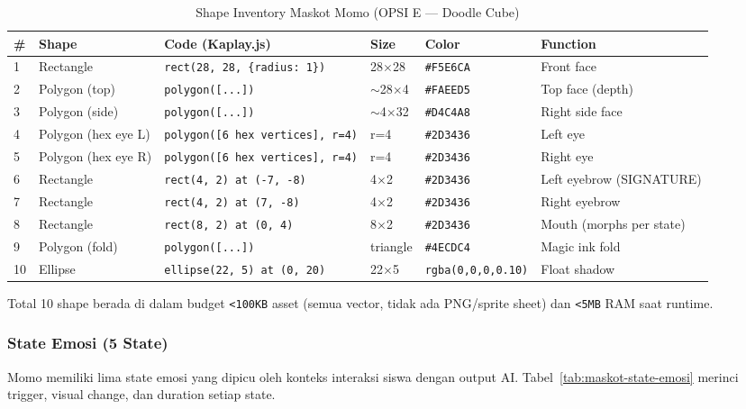 \documentclass[12pt,a4paper,oneside,openany]{report}
\begin{document}
\begin{table}[H]
\centering
\caption{Shape Inventory Maskot Momo (OPSI E --- Doodle Cube)}
\label{tab:maskot-shape-inventory}
\begin{tabular}{|p{0.5cm}|p{2.5cm}|p{5cm}|p{1.5cm}|p{1.8cm}|p{2.5cm}|}
\hline
\textbf{\#} & \textbf{Shape} & \textbf{Code (Kaplay.js)} & \textbf{Size} & \textbf{Color} & \textbf{Function} \\ \hline
1 & Rectangle & \texttt{rect(28, 28, \{radius: 1\})} & 28$\times$28 & \texttt{\#F5E6CA} & Front face \\ \hline
2 & Polygon (top) & \texttt{polygon([...])} & $\sim$28$\times$4 & \texttt{\#FAEED5} & Top face (depth) \\ \hline
3 & Polygon (side) & \texttt{polygon([...])} & $\sim$4$\times$32 & \texttt{\#D4C4A8} & Right side face \\ \hline
4 & Polygon (hex eye L) & \texttt{polygon([6 hex vertices], r=4)} & r=4 & \texttt{\#2D3436} & Left eye \\ \hline
5 & Polygon (hex eye R) & \texttt{polygon([6 hex vertices], r=4)} & r=4 & \texttt{\#2D3436} & Right eye \\ \hline
6 & Rectangle & \texttt{rect(4, 2) at (-7, -8)} & 4$\times$2 & \texttt{\#2D3436} & Left eyebrow (SIGNATURE) \\ \hline
7 & Rectangle & \texttt{rect(4, 2) at (7, -8)} & 4$\times$2 & \texttt{\#2D3436} & Right eyebrow \\ \hline
8 & Rectangle & \texttt{rect(8, 2) at (0, 4)} & 8$\times$2 & \texttt{\#2D3436} & Mouth (morphs per state) \\ \hline
9 & Polygon (fold) & \texttt{polygon([...])} & triangle & \texttt{\#4ECDC4} & Magic ink fold \\ \hline
10 & Ellipse & \texttt{ellipse(22, 5) at (0, 20)} & 22$\times$5 & \texttt{rgba(0,0,0,0.10)} & Float shadow \\ \hline
\end{tabular}
\end{table}

Total 10 shape berada di dalam budget \texttt{<100KB} asset (semua vector, tidak ada PNG/sprite sheet) dan \texttt{<5MB} RAM saat runtime.

\subsubsection{State Emosi (5 State)}

Momo memiliki lima state emosi yang dipicu oleh konteks interaksi siswa dengan output AI. Tabel~\ref{tab:maskot-state-emosi} merinci trigger, visual change, dan duration setiap state.
\end{document}

